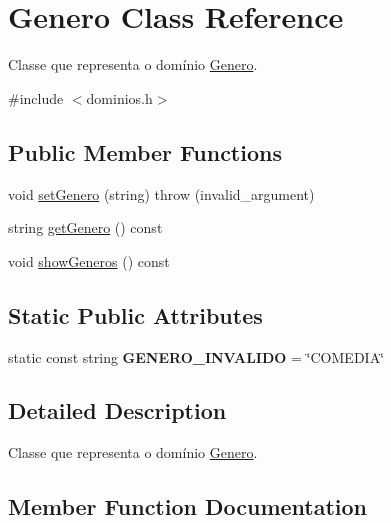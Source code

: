 \hypertarget{classGenero}{}\section{Genero Class Reference}
\label{classGenero}


Classe que representa o domínio \hyperlink{classGenero}{Genero}.  




{\ttfamily \#include $<$dominios.\+h$>$}

\subsection*{Public Member Functions}
\begin{DoxyCompactItemize}
\item 
void \hyperlink{classGenero_adc53f59f5147fb37da8782378cffda9c}{set\+Genero} (string)  throw (invalid\+\_\+argument)
\item 
string \hyperlink{classGenero_aa2a093d178f71b41a07b2b497494e7b4}{get\+Genero} () const
\item 
void \hyperlink{classGenero_a1f7c047f6d2c5b75520673a5c3cca6a6}{show\+Generos} () const
\end{DoxyCompactItemize}
\subsection*{Static Public Attributes}
\begin{DoxyCompactItemize}
\item 
\mbox{\label{classGenero_ad0b507e05f1d8959533d9f8cd4d06a2b}} 
static const string {\bfseries G\+E\+N\+E\+R\+O\+\_\+\+I\+N\+V\+A\+L\+I\+DO} = \char`\"{}C\+O\+M\+E\+D\+IA\char`\"{}
\end{DoxyCompactItemize}


\subsection{Detailed Description}
Classe que representa o domínio \hyperlink{classGenero}{Genero}. 

\subsection{Member Function Documentation}
\mbox{\label{classGenero_aa2a093d178f71b41a07b2b497494e7b4}} 
